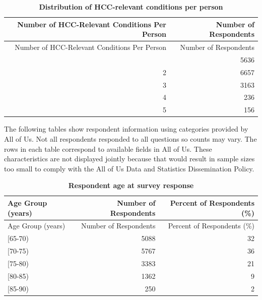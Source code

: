 \documentclass[
  12pt,
  number]{elsarticle}
\begin{document}
\begin{longtable}[]{@{}rr@{}}
\caption{\textbf{Distribution of HCC-relevant conditions per
person}}\tabularnewline
\toprule\noalign{}
Number of HCC-Relevant Conditions Per Person & Number of Respondents \\
\midrule\noalign{}
\endfirsthead
\toprule\noalign{}
Number of HCC-Relevant Conditions Per Person & Number of Respondents \\
\midrule\noalign{}
\endhead
\bottomrule\noalign{}
\endlastfoot
1 & 5636 \\
2 & 6657 \\
3 & 3163 \\
4 & 236 \\
5 & 156 \\
\end{longtable}

The following tables show respondent information using categories
provided by All of Us. Not all respondents responded to all questions so
counts may vary. The rows in each table correspond to available fields
in All of Us. These characteristics are not displayed jointly because
that would result in sample sizes too small to comply with the All of Us
Data and Statistics Dissemination Policy.

\begin{longtable}[]{@{}lrr@{}}
\caption{\textbf{Respondent age at survey response}}\tabularnewline
\toprule\noalign{}
Age Group (years) & Number of Respondents & Percent of Respondents
(\%) \\
\midrule\noalign{}
\endfirsthead
\toprule\noalign{}
Age Group (years) & Number of Respondents & Percent of Respondents
(\%) \\
\midrule\noalign{}
\endhead
\bottomrule\noalign{}
\endlastfoot
{[}65-70) & 5088 & 32 \\
{[}70-75) & 5767 & 36 \\
{[}75-80) & 3383 & 21 \\
{[}80-85) & 1362 & 9 \\
{[}85-90) & 250 & 2 \\
\end{longtable}
\end{document}
